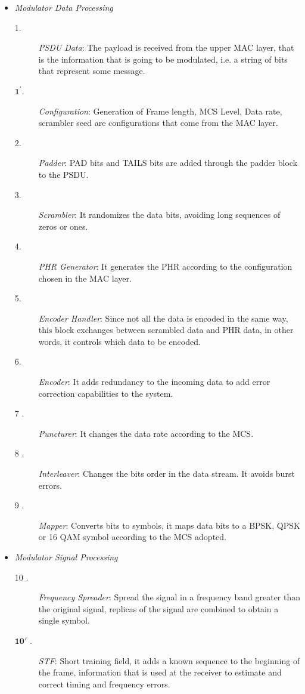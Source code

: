 \begin{itemize}
\item \emph{Modulator Data Processing}

\begin{description}
\item [1. ] \emph{PSDU Data}: The payload is received from the upper MAC layer, that is the information that is going to be modulated, i.e. a string of bits that represent some message.
\item [$\boldsymbol{1^{'}}$.] \emph{Configuration}: Generation of Frame length, MCS Level, Data rate, scrambler seed are configurations that come from the MAC layer.  
\item [2. ] \emph{Padder}: PAD bits and TAILS bits are added through the padder block to the PSDU. 
\item [3. ] \emph{Scrambler}: It randomizes the data bits, avoiding long sequences of zeros or ones.
\item [4. ] \emph{PHR Generator}: It generates the PHR according to the configuration chosen in the MAC layer. 
\item [5. ] \emph{Encoder Handler}: Since not all the data is encoded in the same way, this block exchanges between scrambled data and PHR data, in other words, it controls which data to be encoded.  
\item [6. ] \emph{Encoder}: It adds redundancy to the incoming data to add error correction capabilities to the system. 
\item [7 .] \emph{Puncturer}: It changes the data rate according to the MCS. 
\item [8 .] \emph{Interleaver}: Changes the bits order in the data stream. It avoids burst errors.
\item [9 .] \emph{Mapper}: Converts bits to symbols, it maps data bits to a BPSK, QPSK or 16 QAM symbol according to the MCS adopted. 
\end{description}

\item \emph{Modulator Signal Processing}

\begin{description}
\item [10 .] \emph{Frequency Spreader}: Spread the signal in a frequency band greater than the original signal, replicas of the signal are combined to obtain a single symbol.

\item [$\boldsymbol{10'}$ .] \emph{STF}: Short training field, it adds a known sequence to the beginning of the frame, information that is used at the receiver to estimate and correct timing and frequency errors. 


\end{description}
\end{itemize}
